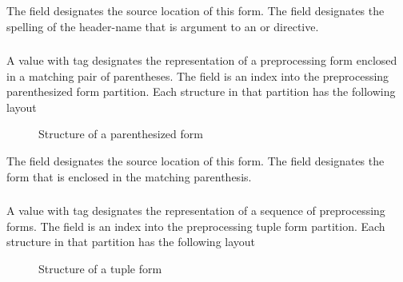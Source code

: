 The field  designates the source location of this form.  The
field  designates the spelling of the header-name 
that is argument to an  or  directive.



\subsubsection{}
\label{sec:ifc:FormSort:Parenthesized}

A  value with tag  designates
the representation of a preprocessing form enclosed in a matching pair 
of parentheses.
The  field is an index into
the preprocessing parenthesized form partition.  Each structure in that partition
has the following layout
%
\begin{figure}[H]
  \centering
  \caption{Structure of a parenthesized form}
  \label{fig:ifc-parenthesized-form}
\end{figure}

The field  designates the source location of this form.  The
field  designates the form that is enclosed in the matching 
parenthesis.



\subsubsection{}
\label{sec:ifc:FormSort:Tuple}

A  value with tag  designates the
representation of a sequence of preprocessing forms.
The  field is an index into
the preprocessing tuple form partition.  Each structure in that partition
has the following layout
%
\begin{figure}[H]
  \centering
  \caption{Structure of a tuple form}
  \label{fig:ifc-tuple-form}
\end{figure}

